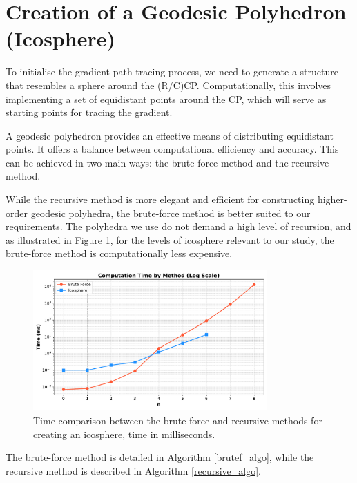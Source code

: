 \newpage
\section{Creation of a Geodesic Polyhedron (Icosphere)}\label{icosphereGeo}

To initialise the gradient path tracing process, we need to generate a structure
that resembles a sphere around the (R/C)CP. Computationally, this involves
implementing a set of equidistant points around the CP, which will serve as
starting points for tracing the gradient.

A geodesic polyhedron provides an effective means of distributing equidistant
points. It offers a balance between computational efficiency and accuracy.
This can be achieved in two main ways: the brute-force method and the recursive
method.

While the recursive method is more elegant and efficient for constructing
higher-order geodesic polyhedra, the brute-force method is better suited to our
requirements. The polyhedra we use do not demand a high level of recursion, and
as illustrated in Figure \ref{ico_time}, for the levels of icosphere relevant
to our study, the brute-force method is computationally less expensive.

\begin{figure}[h]
  \centering
  \includegraphics[width=0.8\textwidth]{img/computation_time.pdf}
  \caption{Time comparison between the brute-force and recursive methods for creating
  an icosphere, time in milliseconds.}
  \label{ico_time}
\end{figure}

The brute-force method is detailed in Algorithm \ref{brutef_algo}, while the
recursive method is described in Algorithm \ref{recursive_algo}. 

\newpage
\vspace*{4cm}

